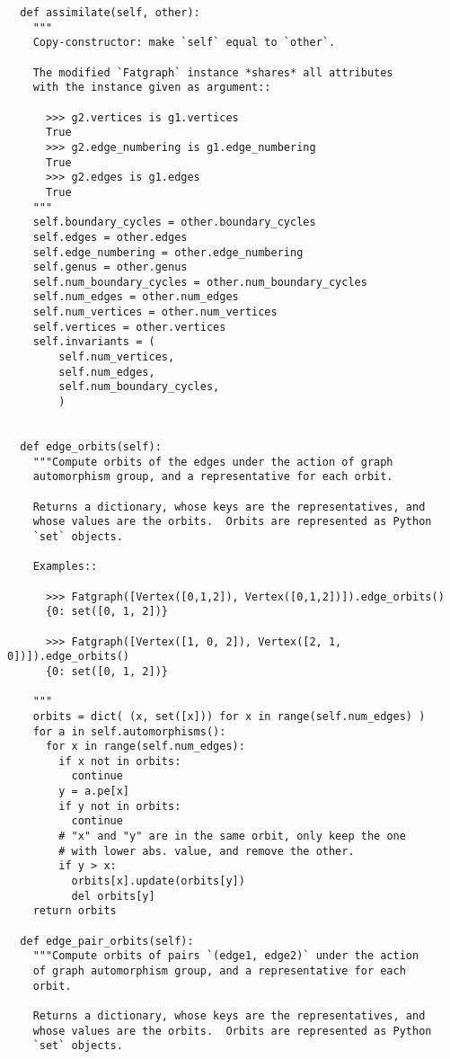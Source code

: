 \begin{lstlisting}
  def assimilate(self, other):
    """
    Copy-constructor: make `self` equal to `other`.

    The modified `Fatgraph` instance *shares* all attributes
    with the instance given as argument::

      >>> g2.vertices is g1.vertices
      True
      >>> g2.edge_numbering is g1.edge_numbering
      True
      >>> g2.edges is g1.edges
      True
    """
    self.boundary_cycles = other.boundary_cycles
    self.edges = other.edges
    self.edge_numbering = other.edge_numbering
    self.genus = other.genus
    self.num_boundary_cycles = other.num_boundary_cycles
    self.num_edges = other.num_edges
    self.num_vertices = other.num_vertices
    self.vertices = other.vertices
    self.invariants = (
        self.num_vertices,
        self.num_edges,
        self.num_boundary_cycles,
        )


  def edge_orbits(self):
    """Compute orbits of the edges under the action of graph
    automorphism group, and a representative for each orbit.
    
    Returns a dictionary, whose keys are the representatives, and
    whose values are the orbits.  Orbits are represented as Python
    `set` objects.

    Examples::

      >>> Fatgraph([Vertex([0,1,2]), Vertex([0,1,2])]).edge_orbits()
      {0: set([0, 1, 2])}

      >>> Fatgraph([Vertex([1, 0, 2]), Vertex([2, 1, 0])]).edge_orbits()
      {0: set([0, 1, 2])}
      
    """
    orbits = dict( (x, set([x])) for x in range(self.num_edges) )
    for a in self.automorphisms():
      for x in range(self.num_edges):
        if x not in orbits:
          continue
        y = a.pe[x]
        if y not in orbits:
          continue
        # "x" and "y" are in the same orbit, only keep the one
        # with lower abs. value, and remove the other.
        if y > x:
          orbits[x].update(orbits[y])
          del orbits[y]
    return orbits

  def edge_pair_orbits(self):
    """Compute orbits of pairs `(edge1, edge2)` under the action
    of graph automorphism group, and a representative for each
    orbit.
    
    Returns a dictionary, whose keys are the representatives, and
    whose values are the orbits.  Orbits are represented as Python
    `set` objects.


\end{lstlisting}
